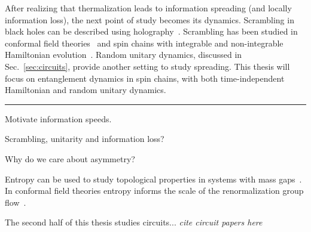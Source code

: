 After realizing that thermalization leads to information spreading (and locally information loss), the next point of study becomes its dynamics. Scrambling in black holes can be described using holography~\cite{Sekino2008, Shenker2014}. Scrambling has been studied in conformal field theories~\cite{Calabrese2005} and spin chains with integrable and non-integrable Hamiltonian evolution~\cite{Fagotti2008, Luchli2008, Kim2013, Baradson2012}. Random unitary dynamics, discussed in Sec.~\ref{sec:circuits}, provide another setting to study spreading. This thesis will focus on entanglement dynamics in spin chains, with both time-independent Hamiltonian and random unitary dynamics. 

\hrule 

Motivate information speeds.

Scrambling, unitarity and information loss?

Why do we care about asymmetry?

Entropy can be used to study topological properties in systems with mass gaps~\cite{Kitaev2006}. In conformal field theories entropy informs the scale of the renormalization group flow~\cite{Casini2011, Myers2011}.

The second half of this thesis studies circuits... \emph{cite circuit papers here}